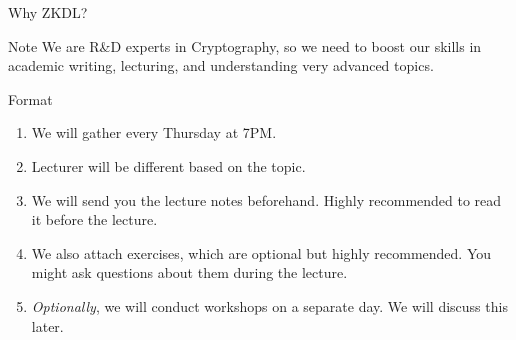 \documentclass{beamer}
\begin{document}
\begin{frame}{Why ZKDL?}
        \begin{alertblock}{Note}
          We are R\&D experts in Cryptography, so we need to boost our skills in academic writing, lecturing, and understanding very advanced topics.
        \end{alertblock}
    \end{frame}

    \begin{frame}{Format}
      \begin{enumerate}
        \item We will gather every Thursday at 7PM.\pause
        \item Lecturer will be different based on the topic.\pause
        \item We will send you the lecture notes beforehand. Highly recommended to read it before the lecture.\pause
        \item We also attach exercises, which are optional but highly recommended. You might ask questions about them during the lecture.\pause
        \item \textit{Optionally}, we will conduct workshops on a separate day. We will discuss this later.
      \end{enumerate}
    \end{frame}
\end{document}

